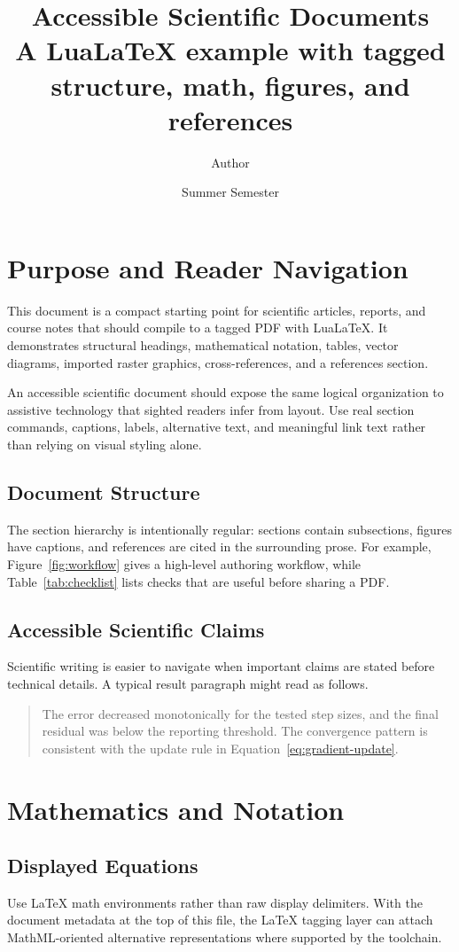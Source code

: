 \documentclass[11pt, letterpaper]{article}
\title{\color{MainBlue}\Huge\bfseries Accessible Scientific Documents\\[0.5cm]
	\large\color{DarkRed} A LuaLaTeX example with tagged structure, math, figures, and references}
\author{Author}
\date{Summer Semester}
\newcommand{\taggedsection}[1]{\section{\texorpdfstring{\color{MainBlue}#1}{#1}}}
\newcommand{\taggedsubsection}[1]{\subsection{\texorpdfstring{\color{DarkGreen}#1}{#1}}}
\begin{document}
\maketitle

\tagpdfparaOn

\tableofcontents
\clearpage

\taggedsection{Purpose and Reader Navigation}

This document is a compact starting point for scientific articles, reports, and course notes that should compile to a tagged PDF with LuaLaTeX. It demonstrates structural headings, mathematical notation, tables, vector diagrams, imported raster graphics, cross-references, and a references section.

\begin{takeawaybox}
	An accessible scientific document should expose the same logical organization to assistive technology that sighted readers infer from layout. Use real section commands, captions, labels, alternative text, and meaningful link text rather than relying on visual styling alone.
\end{takeawaybox}

\taggedsubsection{Document Structure}

The section hierarchy is intentionally regular: sections contain subsections, figures have captions, and references are cited in the surrounding prose. For example, Figure~\ref{fig:workflow} gives a high-level authoring workflow, while Table~\ref{tab:checklist} lists checks that are useful before sharing a PDF.

\taggedsubsection{Accessible Scientific Claims}

Scientific writing is easier to navigate when important claims are stated before technical details. A typical result paragraph might read as follows.

\begin{quote}
	The error decreased monotonically for the tested step sizes, and the final residual was below the reporting threshold. The convergence pattern is consistent with the update rule in Equation~\eqref{eq:gradient-update}.
\end{quote}

\taggedsection{Mathematics and Notation}

\taggedsubsection{Displayed Equations}

Use LaTeX math environments rather than raw display delimiters. With the document metadata at the top of this file, the LaTeX tagging layer can attach MathML-oriented alternative representations where supported by the toolchain.
\end{document}
